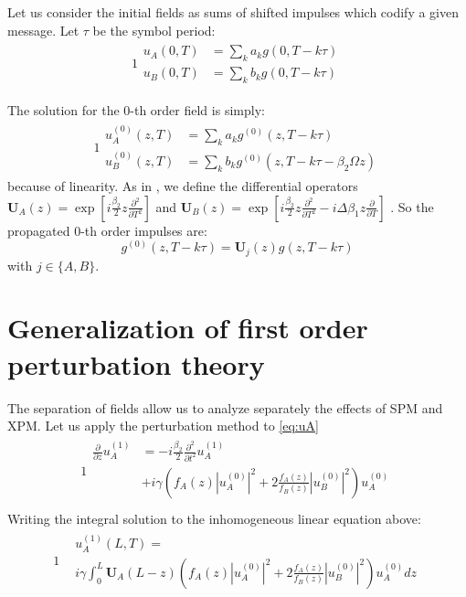 \documentclass[10pt,journal]{IEEEtran}
\begin{document}
Let us consider the initial fields as sums of shifted impulses which codify a given message. Let $\tau$ be the symbol period:
\begin{alignat}{1}
 \begin{aligned}
   u_A(0, T) &= \sum_{k}a_k g(0, T-k\tau)\\
   u_B(0, T) &= \sum_{k}b_k g(0, T-k\tau)
 \end{aligned}
\end{alignat}

The solution for the 0-th order field is simply:
\begin{alignat}{1}
 \begin{aligned}
   u_A^{(0)}(z, T) &= \sum_{k}a_k g^{(0)}(z, T-k\tau)\\
   u_B^{(0)}(z, T) &= \sum_{k}b_k g^{(0)}(z, T-k\tau - \beta_2 \Omega z)
 \end{aligned}
\end{alignat}
because of linearity.
As in \cite{Dar_2013}, we define the differential operators $\mathbf{U}_A(z) = \exp[i \frac{\beta_2}{2} z \frac{\partial^2}{\partial T^2}]$ and $\mathbf{U}_B(z) = \exp[i \frac{\beta_2}{2} z \frac{\partial^2}{\partial T^2} - i \Delta \beta_1 z \frac{\partial}{\partial T}]$ .
So the propagated 0-th order impulses are:
\begin{equation}
 g^{(0)}(z, T-k\tau) = \mathbf{U}_j(z) g(z, T-k\tau)
\end{equation}
with $j \in \{A, B\}$.

\section{Generalization of first order perturbation theory}
The separation of fields allow us to analyze separately the effects of SPM and XPM.
Let us apply the perturbation method to \ref{eq:uA}
\begin{alignat}{1}
 \begin{aligned}
 \frac{\partial}{\partial z} u_A^{(1)} &= -  i \frac{\beta_2}{2} \frac{\partial^2}{\partial t^2} u_A^{(1)} \\ &+ i \gamma \left(f_A(z)|u_A^{(0)}|^2 + 2 \frac{f_A(z)}{f_B(z)} |u_B^{(0)}|^2 \right)u_A^{(0)} \\
 \end{aligned}
\end{alignat} \label{eq:perturbation}
Writing the integral solution to the inhomogeneous linear equation above:
\begin{alignat}{1}
 \begin{aligned}
 &u_A^{(1)}(L, T) =\\ &i\gamma \int_0^L \mathbf{U}_A(L-z)\left(f_A(z)|u_A^{(0)}|^2 + 2 \frac{f_A(z)}{f_B(z)} |u_B^{(0)}|^2 \right)u_A^{(0)} dz
 \end{aligned}
\end{alignat} \label{eq:solution}
\end{document}
